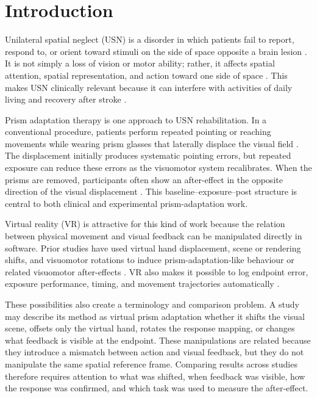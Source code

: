 \section*{Introduction}

Unilateral spatial neglect (USN) is a disorder in which patients fail to report, respond to, or orient toward stimuli on the side of space opposite a brain lesion \cite{heilman2000neglect,Hendrik_Knoche_Lit_Review}. It is not simply a loss of vision or motor ability; rather, it affects spatial attention, spatial representation, and action toward one side of space \cite{heilman2000neglect}. This makes USN clinically relevant because it can interfere with activities of daily living and recovery after stroke \cite{Hendrik_Knoche_Lit_Review,Morse2022}.

Prism adaptation therapy is one approach to USN rehabilitation. In a conventional procedure, patients perform repeated pointing or reaching movements while wearing prism glasses that laterally displace the visual field \cite{Rossetti1998Prism,frassinetti2002long,serino2006mechanisms}. The displacement initially produces systematic pointing errors, but repeated exposure can reduce these errors as the visuomotor system recalibrates. When the prisms are removed, participants often show an after-effect in the opposite direction of the visual displacement \cite{Rossetti1998Prism,frassinetti2002long,serino2006mechanisms}. This baseline--exposure--post structure is central to both clinical and experimental prism-adaptation work.

Virtual reality (VR) is attractive for this kind of work because the relation between physical movement and visual feedback can be manipulated directly in software. Prior studies have used virtual hand displacement, scene or rendering shifts, and visuomotor rotations to induce prism-adaptation-like behaviour or related visuomotor after-effects \cite{kim2017development,Ramos2019,cho2022feasibility,anan2025comparative,gerken2025sense}. VR also makes it possible to log endpoint error, exposure performance, timing, and movement trajectories automatically \cite{cho2022feasibility,anan2025comparative}.

These possibilities also create a terminology and comparison problem. A study may describe its method as virtual prism adaptation whether it shifts the visual scene, offsets only the virtual hand, rotates the response mapping, or changes what feedback is visible at the endpoint. These manipulations are related because they introduce a mismatch between action and visual feedback, but they do not manipulate the same spatial reference frame. Comparing results across studies therefore requires attention to what was shifted, when feedback was visible, how the response was confirmed, and which task was used to measure the after-effect.

